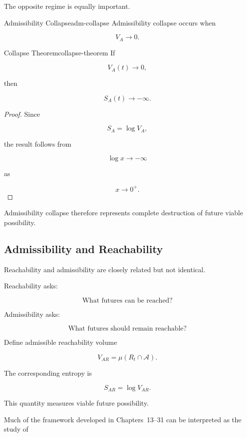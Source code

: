 \documentclass[12pt,twoside,openright]{book}
\begin{document}
The opposite regime is equally important.

\begin{definition}{Admissibility Collapse}{adm-collapse}
Admissibility collapse occurs when

\[
V_A
\rightarrow0.
\]
\end{definition}

\begin{theorem}{Collapse Theorem}{collapse-theorem}
If

\[
V_A(t)
\rightarrow0,
\]

then

\[
S_A(t)
\rightarrow-\infty.
\]
\end{theorem}

\begin{proof}
Since

\[
S_A
=

\log V_A,
\]

the result follows from

\[
\log x
\rightarrow
-\infty
\]

as

\[
x
\rightarrow
0^+.
\]
\end{proof}

Admissibility collapse therefore represents complete
destruction of future viable possibility.

\subsection{Admissibility and Reachability}

Reachability and admissibility are closely related but not
identical.

Reachability asks:

\[
\text{What futures can be reached?}
\]

Admissibility asks:

\[
\text{What futures should remain reachable?}
\]

Define admissible reachability volume

\[
V_{AR}
=

\mu(R_t\cap\mathcal A).
\]

The corresponding entropy is

\[
S_{AR}
=

\log V_{AR}.
\]

This quantity measures viable future possibility.

Much of the framework developed in Chapters~13--31 can be
interpreted as the study of
\end{document}
